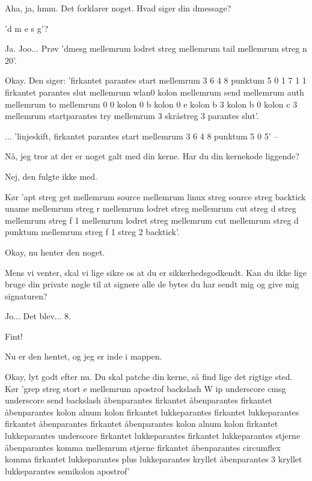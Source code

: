\documentclass[a4paper,11pt]{article}
\begin{document}
\begin{sketch}

 Aha, ja, hmm.  Det forklarer noget.  Hvad siger din dmessage?

 'd m e s g'?

 Ja.  Joo...  Prøv 'dmesg mellemrum lodret streg mellemrum tail
mellemrum streg n 20'.

  Okay.  Den siger: 'firkantet parantes start mellemrum
3 6 4 8 punktum 5 0 1 7 1 1 firkantet parantes slut mellemrum wlan0 kolon
mellemrum send mellemrum auth mellemrum to mellemrum 0 0 kolon 0 b kolon 0 e
kolon b 3 kolon b 0 kolon c 3 mellemrum startparantes try mellemrum 3 skråstreg
3 parantes slut'.


 ... 'linjeskift, firkantet parantes start mellemrum 3 6 4 8 punktum 5 0
5' --

\scene{\texttt{linjeskift, [ 3648.505}}

  Nå, jeg tror at der er noget galt med din kerne.  Har du
din kernekode liggende?

 Nej, den fulgte ikke med.

 Kør 'apt streg get mellemrum source mellemrum linux streg source
streg backtick uname mellemrum streg r mellemrum lodret streg mellemrum cut
streg d streg mellemrum streg f 1 mellemrum lodret streg mellemrum cut mellemrum
streg d punktum mellemrum streg f 1 streg 2 backtick'.


 Okay, nu henter den noget.

 Mens vi venter, skal vi lige sikre os at du er
sikkerhedsgodkendt.  Kan du ikke lige bruge din private nøgle til at
signere alle de bytes du har sendt mig og give mig signaturen?

 Jo...  Det blev... 8.

 Fint!

 Nu er den hentet, og jeg er inde i mappen.

 Okay, lyt godt efter nu.  Du skal patche din kerne, så find
lige det rigtige sted.  Kør 'grep streg stort e mellemrum apostrof
backslash W ip underscore cmsg underscore send backslash åbenparantes
firkantet åbenparantes firkantet åbenparantes kolon alnum kolon
firkantet lukkeparantes firkantet lukkeparantes firkantet åbenparantes
firkantet åbenparantes kolon alnum kolon firkantet lukkeparantes
underscore firkantet lukkeparantes firkantet lukkeparantes stjerne
åbenparantes komma mellemrum stjerne firkantet åbenparantes circumflex
komma firkantet lukkeparantes plus lukkeparantes kryllet åbenparantes
3 kryllet lukkeparantes semikolon apostrof'


\end{sketch}
\end{document}
